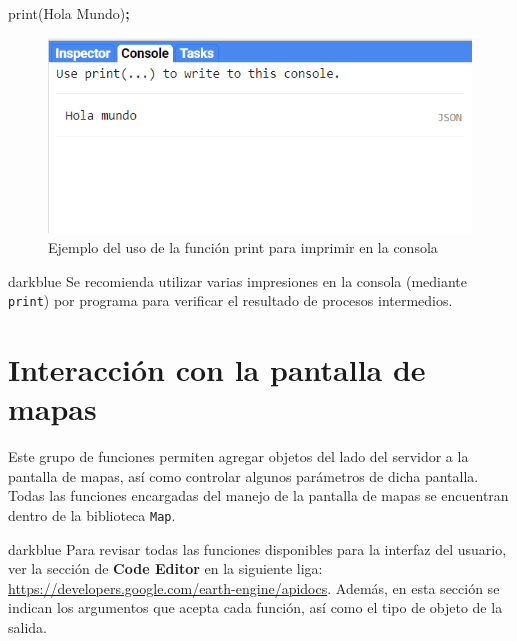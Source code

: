 \documentclass[
  12pt,
  letterpaper,
  twoside]{book}
\newenvironment{Shaded}{\begin{snugshade}}{\end{snugshade}}
\newcommand{\FunctionTok}[1]{\textcolor[rgb]{0.00,0.00,0.00}{#1}}
\newcommand{\NormalTok}[1]{#1}
\newcommand{\OperatorTok}[1]{\textcolor[rgb]{0.81,0.36,0.00}{\textbf{#1}}}
\newcommand{\StringTok}[1]{\textcolor[rgb]{0.31,0.60,0.02}{#1}}
\begin{document}
\begin{Shaded}
\begin{Highlighting}[]
\FunctionTok{print}\NormalTok{(}\StringTok{\textquotesingle{}Hola Mundo\textquotesingle{}}\NormalTok{)}\OperatorTok{;}
\end{Highlighting}
\end{Shaded}

\begin{figure}[btp]

{\centering \includegraphics[width=0.3\linewidth]{Img/holaMundo} 

}

\caption{Ejemplo del uso de la función print para imprimir en la consola}\label{fig:unnamed-chunk-25}
\end{figure}

\begin{bluebox2}

\begin{awesomeblock}{5pt}{\faLightbulb}{darkblue}
Se recomienda utilizar varias impresiones en la consola (mediante \texttt{print}) por programa para verificar el resultado de procesos intermedios.

\end{awesomeblock}

\end{bluebox2}

\hypertarget{interacciuxf3n-con-la-pantalla-de-mapas}{%
\section{Interacción con la pantalla de mapas}\label{interacciuxf3n-con-la-pantalla-de-mapas}}

Este grupo de funciones permiten agregar objetos del lado del servidor a la pantalla de mapas, así como controlar algunos parámetros de dicha pantalla. Todas las funciones encargadas del manejo de la pantalla de mapas se encuentran dentro de la biblioteca \texttt{Map}.

\begin{bluebox2}

\begin{awesomeblock}{5pt}{\faLightbulb}{darkblue}
Para revisar todas las funciones disponibles para la interfaz del usuario, ver la sección de \textbf{Code Editor} en la siguiente liga: \url{https://developers.google.com/earth-engine/apidocs}. Además, en esta sección se indican los argumentos que acepta cada función, así como el tipo de objeto de la salida.

\end{awesomeblock}

\end{bluebox2}
\end{document}

